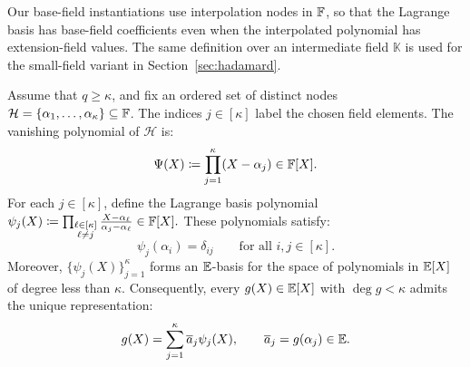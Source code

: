 Our base-field instantiations use interpolation nodes in \({\mathbb{F}}\), so that the Lagrange
basis has base-field coefficients even when the interpolated
polynomial has extension-field values. The same definition over
an intermediate field \(\mathbb K\) is used for the small-field
variant in Section~\ref{sec:hadamard}.


\begin{definition}
\label{def:lagrange}
Assume that \(q\geq\kappa\), and fix an ordered set of distinct
nodes \(\mathcal H=\{\alpha_1,\ldots,\alpha_\kappa\}\subseteq{\mathbb{F}}\).
The indices \(j\in[\kappa]\) label the chosen field elements.
The vanishing polynomial of \(\mathcal H\) is:
\[
    \Psi(X)
    \coloneqq
    \prod_{j=1}^{\kappa}(X-\alpha_j)
    \in{\mathbb{F}}[X].
\]
For each \(j\in[\kappa]\), define the Lagrange basis polynomial
\(
    \psi_j(X)
    \coloneqq
    \prod_{\substack{\ell\in[\kappa]\\ \ell\neq j}}
    \frac{X-\alpha_\ell}{\alpha_j-\alpha_\ell}
    \in{\mathbb{F}}[X].
\)
These polynomials satisfy:
\[
    \psi_j(\alpha_i)=\delta_{ij}
    \qquad
    \text{for all }i,j\in[\kappa].
\]
Moreover, \(\{\psi_j(X)\}_{j=1}^{\kappa}\) forms an
\(\mathbb{E}\)-basis for the space of polynomials in
\(\mathbb{E}[X]\) of degree less than \(\kappa\).
Consequently, every \(g(X)\in\mathbb{E}[X]\) with
\(\deg g<\kappa\) admits the unique representation:
\[
    g(X)
    =
    \sum_{j=1}^{\kappa}
    \overline{a}_j\psi_j(X),
    \qquad
    \overline{a}_j=g(\alpha_j)\in\mathbb{E}.
\]
\end{definition}
